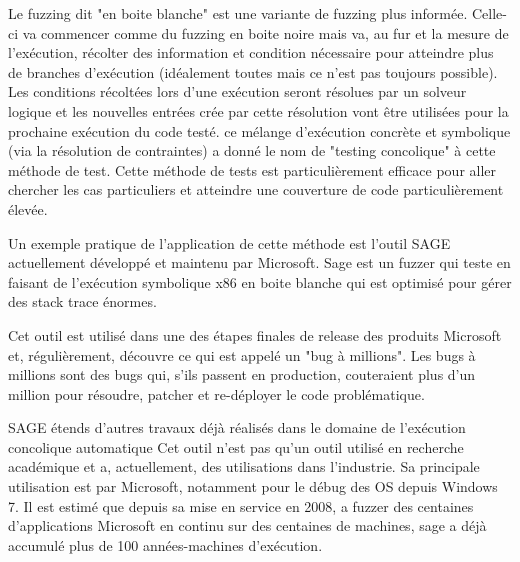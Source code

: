 \documentclass[a4paper]{report}
\begin{document}
Le fuzzing dit "en boite blanche" est une variante de fuzzing plus informée.
Celle-ci va commencer comme du fuzzing en boite noire mais va, au fur et la mesure de l'exécution, récolter des information et condition nécessaire pour atteindre plus de branches d'exécution (idéalement toutes mais ce n'est pas toujours possible).
Les conditions récoltées lors d'une exécution seront résolues par un solveur logique et les nouvelles entrées crée par cette résolution vont être utilisées pour la prochaine exécution du code testé.
ce mélange d'exécution concrète et symbolique (via la résolution de contraintes) a donné le nom de "testing concolique" à cette méthode de test.
Cette méthode de tests est particulièrement efficace pour aller chercher les cas particuliers et atteindre une couverture de code particulièrement élevée.

Un exemple pratique de l'application de cette méthode est l'outil SAGE actuellement développé et maintenu par Microsoft\cite{godefroid2008automated}.
Sage est un fuzzer qui teste en faisant de l'exécution symbolique x86 en boite blanche qui est optimisé pour gérer des stack trace énormes\cite{Godefroid2020}.

Cet outil est utilisé dans une des étapes finales de release des produits Microsoft et, régulièrement, découvre ce  qui est appelé un "bug à millions".
Les bugs à millions sont des bugs qui, s’ils passent en production, couteraient plus d'un million pour résoudre, patcher et re-déployer le code problématique\cite{Godefroid2012}.

SAGE étends d'autres travaux déjà réalisés dans le domaine de l'exécution concolique automatique\cite{Godefroid2020} \cite{cadar2005execution} \cite{godefroid2005dart}
Cet outil n'est pas qu'un outil utilisé en recherche académique et a, actuellement, des utilisations dans l'industrie.
Sa principale utilisation est par Microsoft, notamment pour le débug des OS depuis Windows 7.
Il est estimé que depuis sa mise en service en 2008, a fuzzer des centaines d'applications Microsoft en continu sur des centaines de machines, sage a déjà accumulé plus de 100 années-machines d'exécution\cite{Godefroid2012}.
\end{document}
